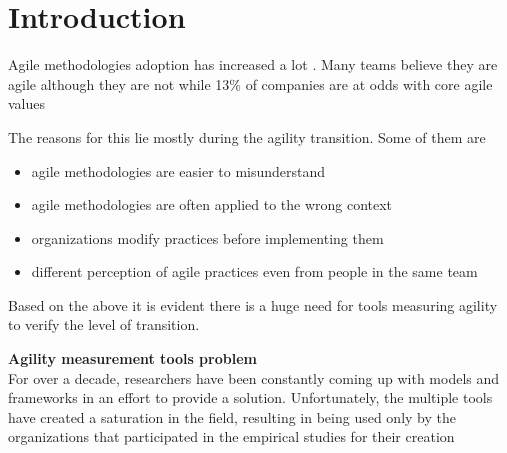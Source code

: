 \section{Introduction}
Agile methodologies adoption has increased a lot \cite{laurie_williams, Wang_Conboy, Salo_Abrahamsson}. Many teams believe they are agile although they are not \cite{ambysoft} while 13\% of companies are at odds with core agile values \cite{versionOne}

The reasons for this lie mostly during the agility transition. Some of them are

\begin{itemize}
	\item agile methodologies are easier to misunderstand \cite{6427226}
	\item agile methodologies are often applied to the wrong context \cite{cefam}
	\item organizations modify practices before implementing them \cite{1579312, 1629340}
	\item different perception of agile practices even from people in the same team \cite{ambler}
\end{itemize}

Based on the above it is evident there is a huge need for tools measuring agility to verify the level of transition.

\textbf{Agility measurement tools problem} \\
For over a decade, researchers have been constantly coming up with models and frameworks in an effort to provide a solution. Unfortunately, the multiple tools have created a saturation in the field, resulting in being used only by the organizations that participated in the empirical studies for their creation \cite{samireh_jalali_dissertation, jalali_angelis}


\clearpage